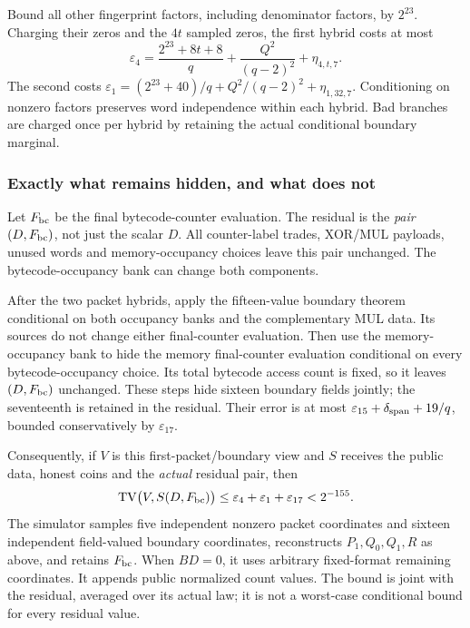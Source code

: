 Bound all other fingerprint factors, including denominator factors, by $2^{23}$. Charging their zeros and the $4t$ sampled zeros, the first hybrid costs at most
\[
 \varepsilon_4=\frac{2^{23}+8t+8}{q}+\frac{Q^2}{(q-2)^2}+\eta_{4,t,7}.
\]
The second costs $\varepsilon_1=(2^{23}+40)/q+Q^2/(q-2)^2+\eta_{1,32,7}$. Conditioning on nonzero factors preserves word independence within each hybrid. Bad branches are charged once per hybrid by retaining the actual conditional boundary marginal.

\subsubsection{Exactly what remains hidden, and what does not}

Let $F_{\rm bc}$ be the final bytecode-counter evaluation. The residual is the \emph{pair} $(D,F_{\rm bc})$, not just the scalar $D$. All counter-label trades, XOR/MUL payloads, unused words and memory-occupancy choices leave this pair unchanged. The bytecode-occupancy bank can change both components.

After the two packet hybrids, apply the fifteen-value boundary theorem conditional on both occupancy banks and the complementary MUL data. Its sources do not change either final-counter evaluation. Then use the memory-occupancy bank to hide the memory final-counter evaluation conditional on every bytecode-occupancy choice. Its total bytecode access count is fixed, so it leaves $(D,F_{\rm bc})$ unchanged. These steps hide sixteen boundary fields jointly; the seventeenth is retained in the residual. Their error is at most $\varepsilon_{15}+\delta_{\rm span}+19/q$, bounded conservatively by $\varepsilon_{17}$.

Consequently, if $V$ is this first-packet/boundary view and $S$ receives the public data, honest coins and the \emph{actual} residual pair, then
\[
 \operatorname{TV}\bigl(V,S(D,F_{\rm bc})\bigr)
 \le \varepsilon_4+\varepsilon_1+\varepsilon_{17}<2^{-155}.
\]
The simulator samples five independent nonzero packet coordinates and sixteen independent field-valued boundary coordinates, reconstructs $P_1,Q_0,Q_1,R$ as above, and retains $F_{\rm bc}$. When $BD=0$, it uses arbitrary fixed-format remaining coordinates. It appends public normalized count values. The bound is joint with the residual, averaged over its actual law; it is not a worst-case conditional bound for every residual value.

